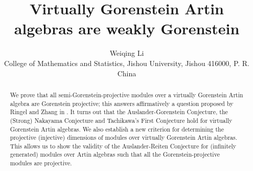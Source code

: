 \documentclass[11pt,a4paper]{article}
\begin{document}
\title{\Large \bf  Virtually Gorenstein Artin algebras are weakly Gorenstein
}



 \vskip 0.5cm
\author{{\normalsize  Weiqing Li }\\
{\small College of Mathematics and Statistics, Jishou University, Jishou 416000,  P. R. China}\date{}}
 \maketitle
 \vskip-1cm


\begin{abstract}  We prove that  all semi-Gorenstein-projective modules over a virtually Gorenstein Artin algebra  are Gorenstein projective;   this
answers affirmatively a question proposed by Ringel and  Zhang in \cite{rz1}.
It turns out that the Auslander-Gorenstein Conjecture, the (Strong) Nakayama Conjecture and Tachikawa's First Conjecture hold for virtually
Gorenstein Artin algebras. We also establish a new criterion for determining  the projective (injective) dimensions    of modules over virtually
Gorenstein Artin algebras. This allows us to show  the  validity  of the Auslander-Reiten  Conjecture for (infinitely generated) modules over  Artin algebras such that all the Gorenstein-projective modules are
projective.
\end{abstract}







\def\s{\stackrel}
\def\Longrightarrow{{\longrightarrow}}
\def\A{\mathcal{A}}
\def\B{\mathcal{B}}
\def\C{\mathcal{C}}
\def\D{\mathcal{D}}
\def\T{\mathcal{T}}
\def\R{\mathcal{R}}
\def\P{\mathcal{P}}
\def\S{\mathcal{S}}
\def\H{\mathcal{H}}
\def\U{\mathscr{U}}
\def\V{\mathscr{V}}
\def\M{\mathscr{M}}
\def\N{\mathcal{N}}
\def\W{\mathscr{W}}
\def\X{\mathscr{X}}
\def\Y{\mathscr{Y}}
\def\Z{\mathcal {Z}}
\def\I{\mathcal {I}}
\def\add{\mbox{add}}
\def\Aut{\mbox{Aut}}
\def\coker{\mbox{coker}}
\def\deg{\mbox{deg}}
\def\diag{\mbox{diag}}
\def\dim{\mbox{dim}}
\def\End{\mbox{End}}
\def\Ext{\mbox{Ext}}
\def\Hom{\mbox{Hom}}
\def\Gr{\mbox{Gr}}
\def\id{\mbox{id}}
\def\Im{\mbox{Im}}
\def\ind{\mbox{ind}}
\def\mod{\mbox{mod}}
\def\mul{\multiput}
\def\c{\circ}
\def \text{\mbox}

\end{document}
